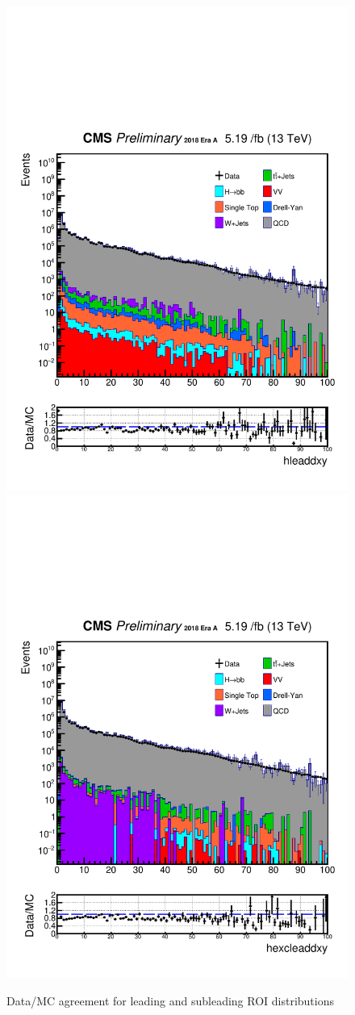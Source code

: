 \begin{figure}[h!]
  \label{fig:DataMCscore2}
  \centering
  \includegraphics[width=0.57\linewidth]{figs/Data_log_Oct6ANVars_MS-15_ctauS-10_hleaddxy.pdf}
  \includegraphics[width=0.57\linewidth]{figs/Data_log_Oct6ANVars_MS-15_ctauS-10_hexcleaddxy.pdf}
  \caption{Data/MC agreement for leading and subleading ROI distributions}

\end{figure}


